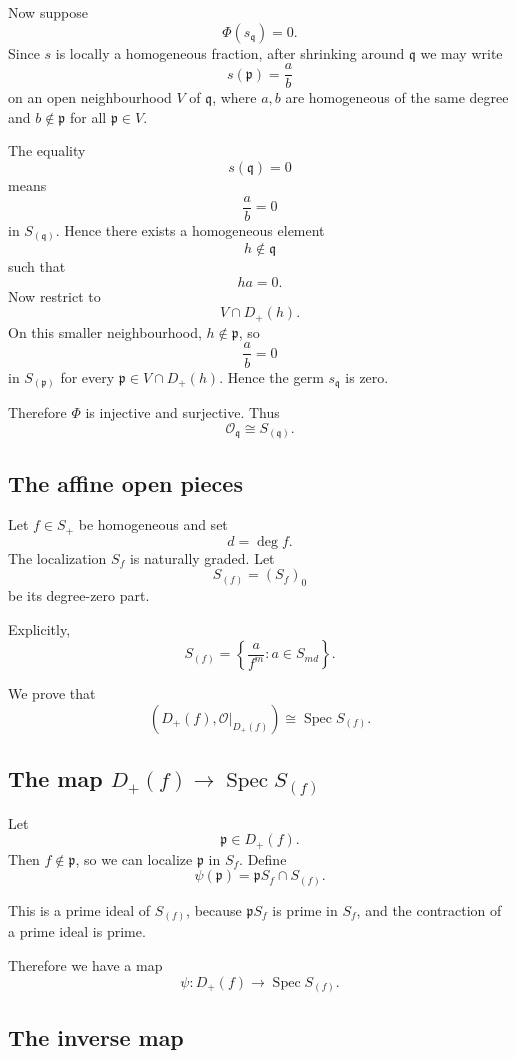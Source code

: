 Now suppose
\[
\Phi(s_{\mathfrak q})=0.
\]
Since \(s\) is locally a homogeneous fraction, after shrinking around \(\mathfrak q\) we may
write
\[
s(\mathfrak p)=\frac{a}{b}
\]
on an open neighbourhood \(V\) of \(\mathfrak q\), where \(a,b\) are homogeneous of the
same degree and \(b\notin\mathfrak p\) for all \(\mathfrak p\in V\).

The equality
\[
s(\mathfrak q)=0
\]
means
\[
\frac{a}{b}=0
\]
in \(S_{(\mathfrak q)}\). Hence there exists a homogeneous element
\[
h\notin \mathfrak q
\]
such that
\[
ha=0.
\]
Now restrict to
\[
V\cap D_+(h).
\]
On this smaller neighbourhood, \(h\notin \mathfrak p\), so
\[
\frac{a}{b}=0
\]
in \(S_{(\mathfrak p)}\) for every \(\mathfrak p\in V\cap D_+(h)\). Hence the germ
\(s_{\mathfrak q}\) is zero.

Therefore \(\Phi\) is injective and surjective. Thus
\[
\boxed{
	\mathcal O_{\mathfrak q}\cong S_{(\mathfrak q)}.
}
\]

\subsection{The affine open pieces}

Let \(f\in S_+\) be homogeneous and set
\[
d=\deg f.
\]
The localization \(S_f\) is naturally graded. Let
\[
S_{(f)}
=
(S_f)_0
\]
be its degree-zero part.

Explicitly,
\[
S_{(f)}
=
\left\{
\frac{a}{f^m} :
a\in S_{md}
\right\}.
\]

We prove that
\[
\left(D_+(f),\mathcal O|_{D_+(f)}\right)
\cong
\operatorname{Spec} S_{(f)}.
\]

\subsection{The map \texorpdfstring{$D_+(f)\to \operatorname{Spec} S_{(f)}$}{D+(f) to Spec S(f)}}

Let
\[
\mathfrak p\in D_+(f).
\]
Then \(f\notin \mathfrak p\), so we can localize \(\mathfrak p\) in \(S_f\). Define
\[
\psi(\mathfrak p)
=
\mathfrak pS_f\cap S_{(f)}.
\]

This is a prime ideal of \(S_{(f)}\), because \(\mathfrak pS_f\) is prime in \(S_f\), and
the contraction of a prime ideal is prime.

Therefore we have a map
\[
\psi:D_+(f)\longrightarrow \operatorname{Spec} S_{(f)}.
\]

\subsection{The inverse map}

